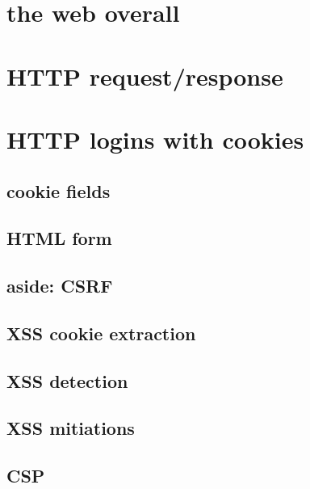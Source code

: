 
\usetikzlibrary{arrows.meta,calc,shapes.callouts,positioning}
\section{the web overall}


\section{HTTP request/response}



%
\section{HTTP logins with cookies}


\subsection{cookie fields}


\subsection{HTML form}

\subsection{aside: CSRF}


\subsection{XSS cookie extraction}




\subsection{XSS detection}


\subsection{XSS mitiations}



\subsection{CSP}


